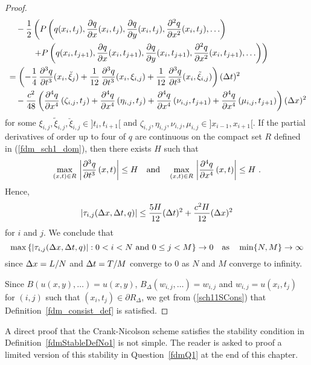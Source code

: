 \begin{proof}
\begin{align*}
&\quad -
\frac{1}{2} \left(
P\left(q(x_i,t_j), \frac{\partial{q}}{\partial{x}}(x_i,t_j), \frac{\partial{q}}{\partial{y}}(x_i,t_j),
\frac{\partial^{2}{q}}{\partial{x}^{2}}(x_i,t_j), \ldots \right) \right. \\
& \left.
\quad\qquad + P\left(q(x_i,t_{j+1}), \frac{\partial{q}}{\partial{x}}(x_i,t_{j+1}),
\frac{\partial{q}}{\partial{y}}(x_i,t_{j+1}), \frac{\partial^{2}{q}}{\partial{x}^{2}}(x_i,t_{j+1}), \ldots \right)
\right) \\
&= \left( -\frac{1}{4}\, \frac{\partial^{3}{q}}{\partial{t}^{3}}(x_i,\breve{\xi}_j)
+ \frac{1}{12}\, \frac{\partial^{3}{q}}{\partial{t}^{3}}(x_i,\xi_{i,j})
+ \frac{1}{12}\, \frac{\partial^{3}{q}}{\partial{t}^{3}}(x_i,\tilde{\xi}_{i,j}) \right) (\Delta{t})^2 \\
&\quad
- \frac{c^2}{48} \left( \frac{\partial^{4}{q}}{\partial{x}^{4}}\left(\zeta_{i,j},t_j\right)
+ \frac{\partial^{4}{q}}{\partial{x}^{4}}\left(\eta_{i,j},t_j\right)
+ \frac{\partial^{4}{q}}{\partial{x}^{4}}\left(\nu_{i,j},t_{j+1}\right)
+ \frac{\partial^{4}{q}}{\partial{x}^{4}}\left(\mu_{i,j},t_{j+1}\right)\right) (\Delta{x})^2
\end{align*}
for some $\xi_{i,j}, \tilde{\xi}_{i,j},\breve{\xi}_{i,j} \in ]t_i,t_{i+1}[$ and
$\zeta_{i,j}, \eta_{i,j},\nu_{i,j},\mu_{i,j} \in ]x_{i-1},x_{i+1}[$.
If the partial derivatives of order up to four of $q$ are continuous on the
compact set $R$ defined in (\ref{fdm_sch1_dom}), then
there exists $H$ such that
\[
\max_{(x,t)\in R}\, \left|\frac{\partial^{3}{q}}{\partial{t}^{3}}\left(x,t\right) \right| \leq H
\quad \text{and} \quad
\max_{(x,t)\in R}\, \left|\frac{\partial^{4}{q}}{\partial{x}^{4}}\left(x,t\right) \right| \leq H \ .
\]
Hence,
\begin{equation} \label{fdm_sch11STrunc}
\left| \tau_{i,j}(\Delta{x},\Delta{t},q) \right | \leq
\frac{5H}{12} (\Delta{t})^2 + \frac{c^2 H}{12} (\Delta{x})^2
\end{equation}
for $i$ and $j$.  We conclude that
\begin{equation} \label{sch11SCons}
\max \left\{ \left|\tau_{i,j}(\Delta{x},\Delta{t},q)\right| :
0<i<N \ \text{and} \ 0\leq j < M
\right\} \rightarrow 0 \quad \text{as} \quad \min \{N, M\} \rightarrow \infty
\end{equation}
since $\Delta{x} = L/N$ and $\Delta{t} = T/M$ converge to $0$ as $N$ and
$M$ converge to infinity.

Since $\displaystyle B\left(u(x,y), \ldots \right) = u(x,y)$,
$\displaystyle B_\Delta(w_{i,j},\ldots) = w_{i,j}$ and $w_{i,j} = u(x_i,t_j)$
for $(i,j)$ such that $(x_i,t_j) \in \partial R_\Delta$, we get from 
(\ref{sch11SCons}) that Definition~\ref{fdm_consist_def} is satisfied.
\end{proof}

A direct proof that the Crank-Nicolson scheme satisfies the stability
condition in Definition~\ref{fdmStableDefNo1} is not simple.
The reader is asked to proof a limited version of this stability in
Question~\ref{fdmQ1} at the end of this chapter.

